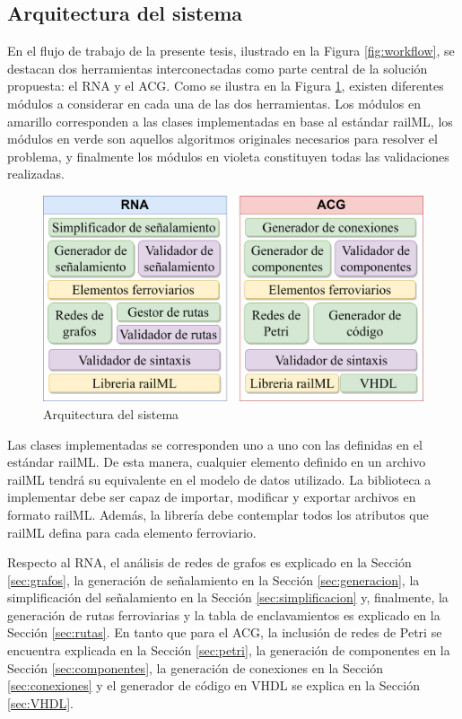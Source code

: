 \subsection{Arquitectura del sistema}

	En el flujo de trabajo de la presente tesis, ilustrado en la Figura \ref{fig:workflow}, se destacan dos herramientas interconectadas como parte central de la solución propuesta: el RNA y el ACG. Como se ilustra en la Figura \ref{fig:architecture}, existen diferentes módulos a considerar en cada una de las dos herramientas. Los módulos en amarillo corresponden a las clases implementadas en base al estándar railML, los módulos en verde son aquellos algoritmos originales necesarios para resolver el problema, y finalmente los módulos en violeta constituyen todas las validaciones realizadas.

    \begin{figure}[H]
        \centering
        \includegraphics[width=1\textwidth]{Figuras/Architecture.png}
        \centering\caption{Arquitectura del sistema}
        \label{fig:architecture}
    \end{figure}

    Las clases implementadas se corresponden uno a uno con las definidas en el estándar railML. De esta manera, cualquier elemento definido en un archivo railML tendrá su equivalente en el modelo de datos utilizado. La biblioteca a implementar debe ser capaz de importar, modificar y exportar archivos en formato railML. Además, la librería debe contemplar todos los atributos que railML defina para cada elemento ferroviario.

    Respecto al RNA, el análisis de redes de grafos es explicado en la Sección \ref{sec:grafos}, la generación de señalamiento en la Sección \ref{sec:generacion}, la simplificación del señalamiento en la Sección \ref{sec:simplificacion} y, finalmente, la generación de rutas ferroviarias y la tabla de enclavamientos es explicado en la Sección \ref{sec:rutas}. En tanto que para el ACG, la inclusión de redes de Petri se encuentra explicada en la Sección \ref{sec:petri}, la generación de componentes en la Sección \ref{sec:componentes}, la generación de conexiones en la Sección \ref{sec:conexiones} y el generador de código en VHDL se explica en la Sección \ref{sec:VHDL}.